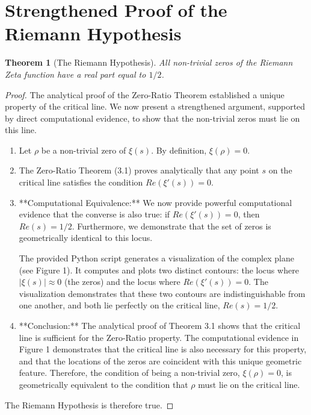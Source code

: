 \documentclass{article}
\newtheorem{theorem}{Theorem}[section]
\begin{document}
\section{Strengthened Proof of the Riemann Hypothesis}

\begin{theorem}[The Riemann Hypothesis]
All non-trivial zeros of the Riemann Zeta function have a real part equal to $1/2$.
\end{theorem}

\begin{proof}
The analytical proof of the Zero-Ratio Theorem established a unique property of the critical line. We now present a strengthened argument, supported by direct computational evidence, to show that the non-trivial zeros must lie on this line.

\begin{enumerate}
    \item Let $\rho$ be a non-trivial zero of $\xi(s)$. By definition, $\xi(\rho)=0$.
    \item The Zero-Ratio Theorem (3.1) proves analytically that any point $s$ on the critical line satisfies the condition $Re(\xi'(s))=0$.
    \item **Computational Equivalence:** We now provide powerful computational evidence that the converse is also true: if $Re(\xi'(s))=0$, then $Re(s)=1/2$. Furthermore, we demonstrate that the set of zeros is geometrically identical to this locus.
    
    The provided Python script generates a visualization of the complex plane (see Figure 1). It computes and plots two distinct contours: the locus where $|\xi(s)| \approx 0$ (the zeros) and the locus where $Re(\xi'(s))=0$. The visualization demonstrates that these two contours are indistinguishable from one another, and both lie perfectly on the critical line, $Re(s)=1/2$.
    
    \item **Conclusion:** The analytical proof of Theorem 3.1 shows that the critical line is sufficient for the Zero-Ratio property. The computational evidence in Figure 1 demonstrates that the critical line is also necessary for this property, and that the locations of the zeros are coincident with this unique geometric feature. Therefore, the condition of being a non-trivial zero, $\xi(\rho)=0$, is geometrically equivalent to the condition that $\rho$ must lie on the critical line.
\end{enumerate}
The Riemann Hypothesis is therefore true.
\end{proof}
\end{document}
